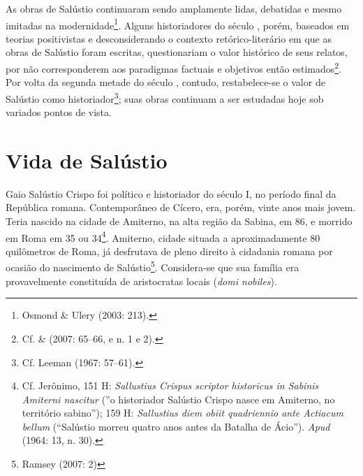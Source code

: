 As
obras de Salústio continuaram sendo amplamente lidas, debatidas e mesmo
imitadas na modernidade\footnote{Osmond \& Ulery (2003: 213).}. Alguns
historiadores do século , porém, baseados em teorias positivistas e
desconsiderando o contexto retórico-literário em que as obras de Salústio foram
escritas, questionariam o valor histórico de seus relatos, por não
corresponderem aos paradigmas factuais e objetivos então estimados\footnote{Cf.  \&  (2007: 65--66, e n. 1 e 2).}.  Por volta da segunda
  metade do século , contudo, restabelece-se o valor de Salústio
  como historiador\footnote{Cf. Leeman (1967: 57--61).}; suas obras
  continuam a ser estudadas hoje sob variados pontos de vista.


\section{Vida de Salústio}

Gaio Salústio Crispo foi político e historiador do século I, no período
final da República romana.  Contemporâneo de Cícero, era, porém, vinte anos
mais jovem. Teria nascido na cidade de Amiterno, na alta região da Sabina, em
86, e morrido em Roma em 35 ou 34\footnote{Cf. Jerônimo,  151 H:
\emph{Sallustius Crispus scriptor historicus in Sabinis Amiterni nascitur} (''o historiador Salústio Crispo nasce em Amiterno, no território sabino''); 
159 H: \emph{Sallustius diem obiit quadriennio ante Actiacum bellum} (``Salústio morreu quatro anos antes da Batalha de Ácio'').
\emph{Apud}  (1964:  13, n. 30).}. Amiterno, cidade situada
a aproximadamente 80 quilômetros de Roma, já desfrutava de pleno direito à
cidadania romana por ocasião do nascimento de Salústio\footnote{Ramsey (2007: 2)}. Considera-se que sua família era provavelmente constituída de
aristocratas locais (\emph{domi nobiles}). 

